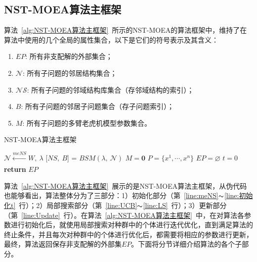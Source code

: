 \subsection{NST-MOEA算法主框架}
\label{subsec:NST:算法设计:NST-MOEA算法主框架}
算法~\ref{alg:NST-MOEA算法主框架}~所示的NST-MOEA的算法框架中，维持了在算法中使用的几个全局的属性集合，以下是它们的符号表示及其含义：
\begin{enumerate}
    \item $EP$: 所有非支配解的外部集合；
    \item $\mathcal{N}$: 所有子问题的邻居结构集合；
    \item $\mathcal{NS}$: 所有子问题的邻域结构库集合（存邻域结构的索引）；
    \item $B$: 所有子问题的邻居子问题集合（存子问题索引）；
    \item $M$: 所有子问题的多臂老虎机模型参数集合。
\end{enumerate}
\par
\begin{algorithm}[!h]
    \caption{NST-MOEA算法主框架}
    \label{alg:NST-MOEA算法主框架}
    \BlankLine
    $\mathcal{N} \xleftarrow[]{meNS} W, \ \lambda$ \label{line:meNS} \;
    [$NS, \ B$] = $BSM(\lambda, \ \mathcal{N})$ \label{line:BSM} \;
    $M = \mathbf{0}$ \label{line:MAB} \;
    $P = \{x^1, \cdots, x^n\}$ \label{line:初始化P} \;
    $EP = \varnothing$  \label{line:初始化EP}\;
    $t = 0$ \label{line:初始化t} \;
    \textbf{return } $EP$ \;
\end{algorithm}
算法~\ref{alg:NST-MOEA算法主框架}~展示的是NST-MOEA算法主框架，从伪代码也能够看出，算法整体分为了三部分：1）初始化部分（第~\ref{line:meNS}$\thicksim$\ref{line:初始化t}~行）；2）局部搜索部分（第~\ref{line:UCB}$\thicksim$\ref{line:LS}~行）；3）更新部分（第~\ref{line:Update}~行）。在算法~\ref{alg:NST-MOEA算法主框架}~中，在对算法各参数进行初始化后，就使用局部搜索对种群中的个体进行迭代优化，直到满足算法的终止条件，并且每次对种群中的个体进行优化后，都需要将相应的参数进行更新，最终，算法返回保存非支配解的外部集$EP$。下面将分节详细介绍算法的各个子部分。


